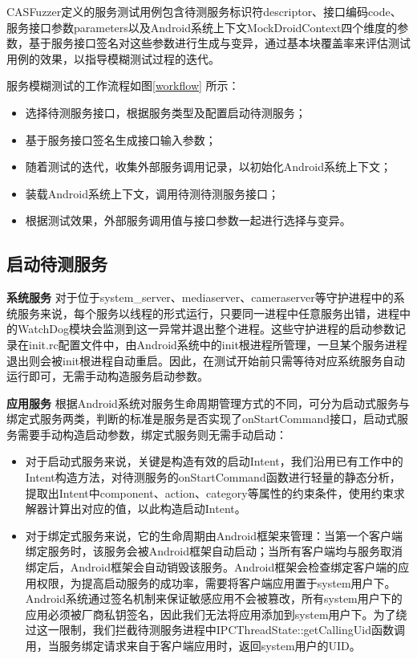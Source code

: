 \documentclass[winfonts,master,twoside]{njuthesis}
\begin{document}
CASFuzzer定义的服务测试用例包含待测服务标识符descriptor、接口编码code、服务接口参数parameters以及Android系统上下文MockDroidContext四个维度的参数，基于服务接口签名对这些参数进行生成与变异，通过基本块覆盖率来评估测试用例的效果，以指导模糊测试过程的迭代。

服务模糊测试的工作流程如图\ref{workflow} 所示：
\begin{itemize}
	\item 选择待测服务接口，根据服务类型及配置启动待测服务；
	\item 基于服务接口签名生成接口输入参数；
	\item 随着测试的迭代，收集外部服务调用记录，以初始化Android系统上下文；
	\item 装载Android系统上下文，调用待测待测服务接口；
	\item 根据测试效果，外部服务调用值与接口参数一起进行选择与变异。
\end{itemize}

\subsection{启动待测服务}

\textbf{系统服务} \quad 对于位于system\_server、mediaserver、cameraserver等守护进程中的系统服务来说，每个服务以线程的形式运行，只要同一进程中任意服务出错，进程中的WatchDog模块会监测到这一异常并退出整个进程。这些守护进程的启动参数记录在init.rc配置文件中，由Android系统中的init根进程所管理，一旦某个服务进程退出则会被init根进程自动重启。因此，在测试开始前只需等待对应系统服务自动运行即可，无需手动构造服务启动参数。

\textbf{应用服务} \quad 根据Android系统对服务生命周期管理方式的不同，可分为启动式服务与绑定式服务两类，判断的标准是服务是否实现了onStartCommand接口，启动式服务需要手动构造启动参数，绑定式服务则无需手动启动：
\begin{itemize}
	\item 对于启动式服务来说，关键是构造有效的启动Intent，我们沿用已有工作\cite{zhang2017systematically}\cite{yang2014intentfuzzer}中的Intent构造方法，对待测服务的onStartCommand函数进行轻量的静态分析，提取出Intent中component、action、category等属性的约束条件，使用约束求解器计算出对应的值，以此构造启动Intent。
	\item 对于绑定式服务来说，它的生命周期由Android框架来管理：当第一个客户端绑定服务时，该服务会被Android框架自动启动；当所有客户端均与服务取消绑定后，Android框架会自动销毁该服务。Android框架会检查绑定客户端的应用权限，为提高启动服务的成功率，需要将客户端应用置于system用户下。Android系统通过签名机制来保证敏感应用不会被篡改，所有system用户下的应用必须被厂商私钥签名，因此我们无法将应用添加到system用户下。为了绕过这一限制，我们拦截待测服务进程中IPCThreadState::getCallingUid函数调用，当服务绑定请求来自于客户端应用时，返回system用户的UID。
\end{itemize}
\end{document}
